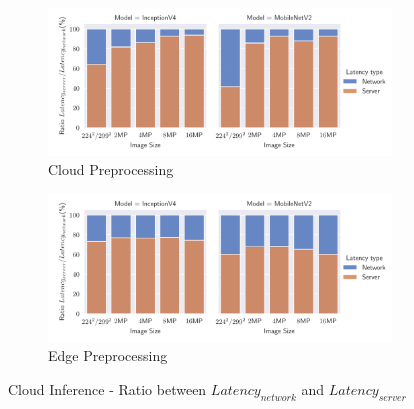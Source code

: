 \begin{figure}[H]
\centering
\begin{subfigure}[b]{0.95\textwidth}
   \includegraphics[width=1\linewidth]{./Bilder/single_plots/cloud_inference_plots/Cloud_ratio_server_total_latency_(cloud_prepro).pdf}
   \caption{Cloud Preprocessing}
   \label{fig:CloudInferenceratioCloud} 
\end{subfigure}

\begin{subfigure}[b]{0.95\textwidth}
   \includegraphics[width=1\linewidth]{./Bilder/single_plots/cloud_inference_plots/Cloud_ratio_server_total_latency_(edge_prepro).pdf}
   \caption{Edge Preprocessing}
   \label{fig:CloudInferenceRatioEdge}
\end{subfigure}

\caption{Cloud Inference -  Ratio between $Latency_{network}$ and $Latency_{server}$}
\end{figure}

